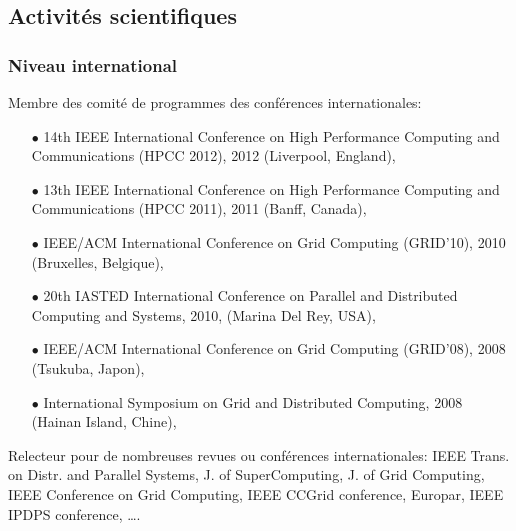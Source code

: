 \documentclass[11pt]{article}
\begin{document}
\subsection{Activités scientifiques}

\subsubsection{Niveau international}
Membre des comité de programmes des conférences internationales:\\[-3mm]
\begin{itemize}
\item[$\bullet$] 
14th IEEE International Conference on High Performance Computing and Communications (HPCC 2012), 
2012 (Liverpool, England),
\item[$\bullet$] 
13th IEEE International Conference on High Performance Computing and Communications (HPCC 2011), 
2011 (Banff, Canada),
\item[$\bullet$] 
IEEE/ACM International Conference on Grid Computing (GRID'10), 2010 (Bruxelles, Belgique),
\item[$\bullet$] 
20th IASTED International Conference on Parallel and Distributed Computing and Systems, 2010, (Marina Del Rey, USA),
\item[$\bullet$] 
IEEE/ACM International Conference on Grid Computing (GRID'08), 2008 (Tsukuba, Japon), 
\item [$\bullet$]
International Symposium on Grid and Distributed Computing, 2008 (Hainan Island, Chine),\\
\end{itemize}

Relecteur pour de nombreuses revues ou conférences internationales: IEEE Trans. on Distr. and Parallel Systems, 
J. of SuperComputing, J. of Grid Computing, IEEE Conference on Grid Computing, IEEE CCGrid conference, Europar,
IEEE IPDPS conference, \ldots.
\end{document}
